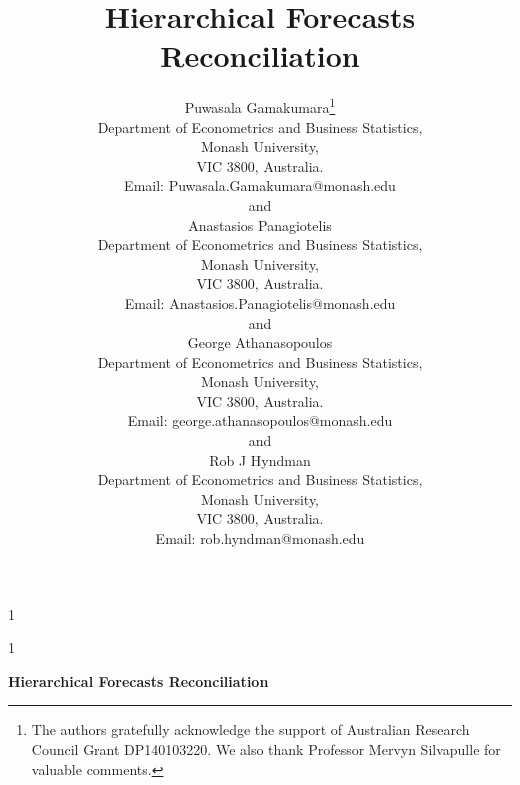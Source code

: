 \documentclass[12pt]{article}
\newcommand{\blind}{1}
\theoremstyle{definition}
\theoremstyle{property}
\begin{document}
	
	
	
	\def\spacingset#1{\renewcommand{\baselinestretch}%
		{#1}\small\normalsize} \spacingset{1}
	
	
	
	\blind
	{
		\title{\bf Hierarchical Forecasts Reconciliation}
		\author{Puwasala Gamakumara\thanks{
				The authors gratefully acknowledge the support of Australian Research Council Grant DP140103220.  We also thank Professor Mervyn Silvapulle for valuable comments.}\hspace{.2cm}\\
			Department of Econometrics and Business Statistics,\\
			Monash University,\\ VIC 3800, Australia.\\
			Email: Puwasala.Gamakumara@monash.edu \\
			and \\
			Anastasios Panagiotelis\\
			Department of Econometrics and Business Statistics,\\
			Monash University,\\ VIC 3800, Australia.\\
			Email: Anastasios.Panagiotelis@monash.edu \\
			and \\
			George Athanasopoulos\\
			Department of Econometrics and Business Statistics,\\
			Monash University,\\ VIC 3800, Australia.\\
			Email: george.athanasopoulos@monash.edu \\
			and \\
			Rob J Hyndman\\
			Department of Econometrics and Business Statistics,\\
			Monash University,\\ VIC 3800, Australia.\\
			Email: rob.hyndman@monash.edu \\}
		\maketitle
	} \fi
	
	\blind
	{
		\bigskip
		\bigskip
		\bigskip
		\begin{center}
			{\LARGE\bf Hierarchical Forecasts Reconciliation}
		\end{center}
		\medskip
	} \fi
	
\end{document}
